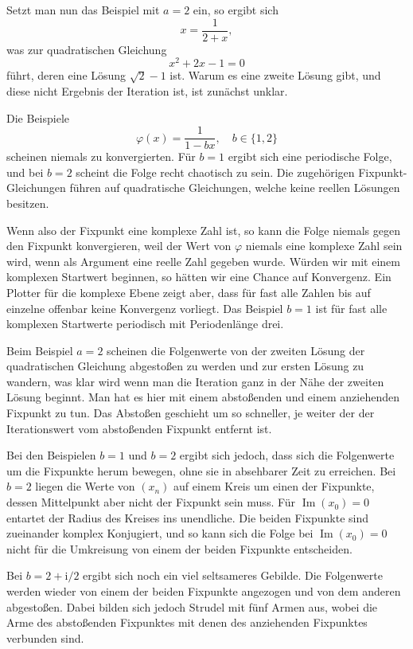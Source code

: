 \documentclass[a4paper,11pt,fleqn,twoside]{scrartcl}
\numberwithin{equation}{section}
\renewcommand{\Im}{\operatorname{Im}}
\newcommand{\ui}{\mathrm i}
\begin{document}
Setzt man nun das Beispiel mit $a=2$ ein, so ergibt
sich
\begin{equation}
x = \frac{1}{2+x},
\end{equation}
was zur quadratischen Gleichung
\begin{equation}
x^2+2x-1 = 0
\end{equation}
führt, deren eine Lösung $\sqrt{2}-1$ ist. Warum es eine zweite
Lösung gibt, und diese nicht Ergebnis der Iteration ist, ist
zunächst unklar.

Die Beispiele
\begin{equation}
\varphi(x) = \frac{1}{1-bx},\quad b\in\{1,2\}
\end{equation}
scheinen niemals zu konvergierten. Für $b=1$ ergibt sich eine
periodische Folge, und bei $b=2$ scheint die Folge recht
chaotisch zu sein. Die zugehörigen Fixpunkt-Gleichungen führen
auf quadratische Gleichungen, welche keine reellen Lösungen
besitzen.

Wenn also der Fixpunkt eine komplexe Zahl ist, so kann die Folge
niemals gegen den Fixpunkt konvergieren, weil der Wert von $\varphi$
niemals eine komplexe Zahl sein wird, wenn als Argument eine
reelle Zahl gegeben wurde. Würden wir mit einem komplexen Startwert
beginnen, so hätten wir eine Chance auf Konvergenz. Ein Plotter
für die komplexe Ebene zeigt aber, dass für fast alle
Zahlen bis auf einzelne offenbar keine Konvergenz vorliegt.
Das Beispiel $b=1$ ist für fast alle komplexen Startwerte periodisch
mit Periodenlänge drei.

Beim Beispiel $a=2$ scheinen die Folgenwerte von der zweiten
Lösung der quadratischen Gleichung abgestoßen zu werden
und zur ersten Lösung zu wandern, was klar wird wenn man die
Iteration ganz in der Nähe der zweiten Lösung beginnt.
Man hat es hier mit einem abstoßenden und einem anziehenden
Fixpunkt zu tun. Das Abstoßen geschieht um so schneller, je weiter
der der Iterationswert vom abstoßenden Fixpunkt entfernt ist.

Bei den Beispielen $b=1$ und $b=2$ ergibt sich jedoch, dass sich
die Folgenwerte um die Fixpunkte herum bewegen, ohne sie in
absehbarer Zeit zu erreichen. Bei $b=2$ liegen die Werte
von $(x_n)$ auf einem Kreis um einen der Fixpunkte, dessen
Mittelpunkt aber nicht der Fixpunkt sein muss. Für
$\Im(x_0)=0$ entartet der Radius des Kreises ins unendliche. Die
beiden Fixpunkte sind zueinander komplex Konjugiert, und so kann
sich die Folge bei $\Im(x_0)=0$ nicht für die Umkreisung von einem
der beiden Fixpunkte entscheiden.

Bei $b=2+\ui/2$ ergibt sich noch ein viel seltsameres Gebilde.
Die Folgenwerte werden wieder von einem der beiden Fixpunkte
angezogen und von dem anderen abgestoßen. Dabei bilden sich
jedoch Strudel mit fünf Armen aus, wobei die Arme des abstoßenden
Fixpunktes mit denen des anziehenden Fixpunktes verbunden sind.
\end{document}
